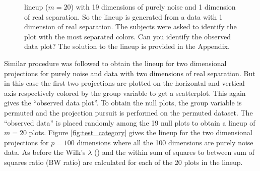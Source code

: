 \documentclass[12]{article}
\begin{document}
%
\begin{figure}[hbtp]
   \centering
       \caption{lineup  ($m=20$) with 19 dimensions of purely noise  and 1 dimension of real separation. So the lineup is generated from a data with 1 dimension of real separation. The subjects were asked to identify the plot with the most separated colors. Can you identify the observed data plot? The solution to the lineup is provided in the Appendix. }
     \label{fig:test_category_1d}
\end{figure}
%
%

Similar procedure was followed to obtain the lineup  for two dimensional projections for purely noise and data with two dimensions of real separation. But in this case the first two projections are plotted on the horizontal and vertical axis respectively colored by the group variable to get a scatterplot. This again gives the ``observed data plot''. To obtain the null plots, the group variable is permuted and the projection pursuit is performed on the permuted dataset. The ``observed data'' is placed randomly among the 19 null plots to obtain a lineup of $m = 20$ plots. Figure \ref{fig:test_category} gives the lineup  for the two dimensional projections for $p =100$ dimensions where all the 100 dimensions are purely noise data. As before the Wilk's $\lambda$ (\cite{JW02})  and the within sum of squares to between sum of squares ratio (BW ratio) are calculated for each of the 20 plots in the lineup. 
 
\end{document}
